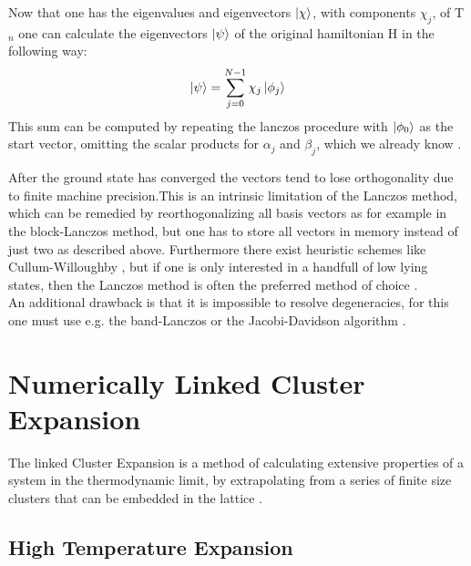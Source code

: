 \documentclass[a4paper,12pt]{article}
\begin{document}
Now that one has the eigenvalues and eigenvectors $\ket{\chi}$, with
components $\chi_j$, of
T$_n$ one can calculate the eigenvectors $\ket{\psi}$ of the original
hamiltonian H in the following way:
\begin{equation}
\label{eq:15}
\ket{\psi} = \sum\limits_{j=0}^{N-1} \chi_j \ket{\phi_j}
\end{equation}
This sum can be computed by repeating the lanczos procedure with
$\ket{\phi_0}$ as the start vector, omitting the scalar products for $\alpha_j$ and
$\beta_j$, which we already know \cite{Fehske}.

After the ground state has converged the vectors tend to lose
orthogonality due to finite machine precision.This is an intrinsic
limitation of the Lanczos method, which can be remedied by
reorthogonalizing all basis vectors as for example in the block-Lanczos
method, but one has to store all vectors in memory instead of just two
as described above. Furthermore there exist heuristic schemes like
Cullum-Willoughby \cite{Cullum2,Cullum}, but if one is only interested in a handfull of low
lying states, then the Lanczos method is often the preferred method of
choice \cite{Noack}.\\
An additional drawback is that it is impossible to resolve
degeneracies, for this one must use e.g. the band-Lanczos or the
Jacobi-Davidson algorithm \cite{Fehske}.\\ 

\section{Numerically Linked Cluster Expansion}
The linked Cluster Expansion is a method of calculating extensive properties of
a system in the thermodynamic limit, by extrapolating
from a series of finite size clusters that can be embedded in the
lattice \cite{Rigol,Series,Domb}.\\
\subsection{High Temperature Expansion}
\end{document}
